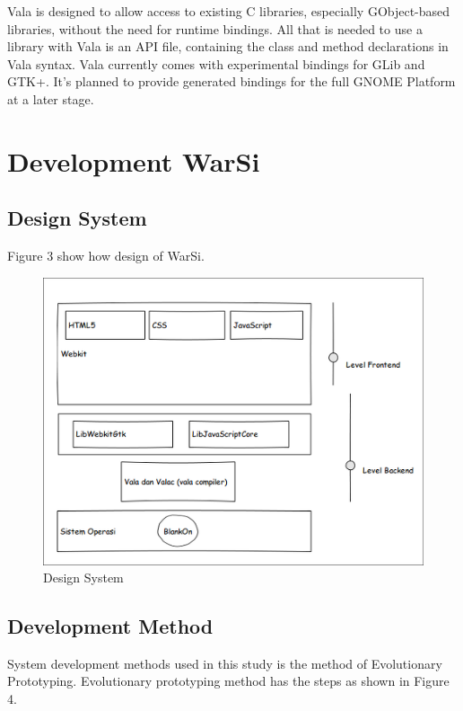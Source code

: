 \documentclass[conference, letterpaper]{IEEEtran}
\begin{document}
Vala is designed to allow access to existing C libraries, especially GObject-based libraries, without the need for runtime bindings. All that is needed to use a library with Vala is an API file, containing the class and method declarations in Vala syntax. Vala currently comes with experimental bindings for GLib and GTK+. It's planned to provide generated bindings for the full GNOME Platform at a later stage.

\section{Development WarSi}
\subsection{Design System}
Figure 3 show how design of WarSi.

\begin{figure}[hbtp]
\centering
\includegraphics[scale=0.5]{image/DesignSystem.png}
\caption{Design System}
\end{figure}

\subsection{Development Method}
System development methods used in this study is the method of Evolutionary Prototyping. Evolutionary prototyping method has the steps as shown in Figure 4.
\end{document}

